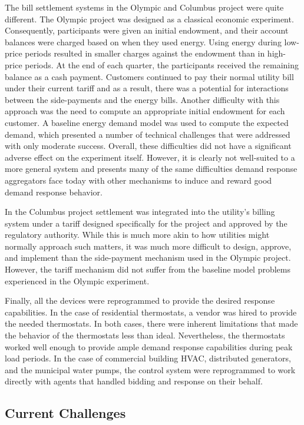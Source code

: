 The bill settlement systems in the Olympic and Columbus project were quite different.  The Olympic project was designed as a classical economic experiment.  Consequently, participants were given an initial endowment, and their account balances were charged based on when they used energy. Using energy during low-price periods resulted in smaller charges against the endowment than in high-price periods. At the end of each quarter, the participants received the remaining balance as a cash payment. Customers continued to pay their normal utility bill under their current tariff and as a result, there was a potential for interactions between the side-payments and the energy bills.  Another difficulty with this approach was the need to compute an appropriate initial endowment for each customer.  A baseline energy demand model was used to compute the expected demand, which presented a number of technical challenges that were addressed with only moderate success.  Overall, these difficulties did not have a significant adverse effect on the experiment itself. However, it is clearly not well-suited to a more general system and presents many of the same difficulties demand response aggregators face today with other mechanisms to induce and reward good demand response behavior.

In the Columbus project settlement was integrated into the utility's billing system under a tariff designed specifically for the project and approved by the regulatory authority. While this is much more akin to how utilities might normally approach such matters, it was much more difficult to design, approve, and implement than the side-payment mechanism used in the Olympic project.  However, the tariff mechanism did not suffer from the baseline model problems experienced in the Olympic experiment.

Finally, all the devices were reprogrammed to provide the desired response capabilities. In the case of residential thermostats, a vendor was hired to provide the needed thermostats.  In both cases, there were inherent limitations that made the behavior of the thermostats less than ideal. Nevertheless, the thermostats worked well enough to provide ample demand response capabilities during peak load periods.  In the case of commercial building HVAC, distributed generators, and the municipal water pumps, the control system were reprogrammed to work directly with agents that handled bidding and response on their behalf.

\subsection{Current Challenges}

